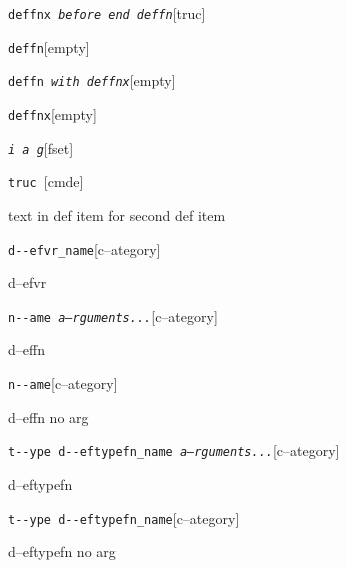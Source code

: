 \documentclass{book}
\begin{document}
\begin{titlepage}
%
\noindent\texttt{deffnx \bgroup{}\normalfont{}\textsl{before end deffn}\egroup{}}\hfill[truc]



%


\noindent\texttt{deffn}\hfill[empty]



%

\noindent\texttt{deffn \bgroup{}\normalfont{}\textsl{with deffnx}\egroup{}}\hfill[empty]



%
\noindent\texttt{deffnx}\hfill[empty]



%

\noindent\texttt{\textsl{i} \bgroup{}\normalfont{}\textsl{a g}\egroup{}}\hfill[fset]



%
\noindent\texttt{truc \bgroup{}\normalfont{}\textsl{}\egroup{}}\hfill[cmde]



%
text in def item for second def item


\noindent\texttt{d{-}{-}efvr\_name}\hfill[c--ategory]



%
d--efvr

\noindent\texttt{n{-}{-}ame \bgroup{}\normalfont{}\textsl{a--rguments...}\egroup{}}\hfill[c--ategory]



%
d--effn

\noindent\texttt{n{-}{-}ame}\hfill[c--ategory]



%
d--effn no arg

\noindent\texttt{t{-}{-}ype d{-}{-}eftypefn\_name \bgroup{}\normalfont{}\textsl{a--rguments...}\egroup{}}\hfill[c--ategory]



%
d--eftypefn

\noindent\texttt{t{-}{-}ype d{-}{-}eftypefn\_name}\hfill[c--ategory]



%
d--eftypefn no arg


\end{titlepage}
\end{document}
